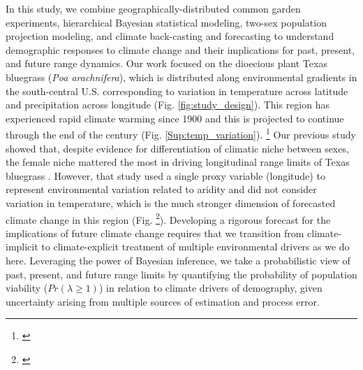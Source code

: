 \documentclass[12pt]{article}\usepackage[]{graphicx}\usepackage[dvipsnames]{xcolor}
\newcommand{\tom}[2]{{\color{red}{#1}}\footnote{\textit{\color{red}{#2}}}}
\begin{document}

In this study, we combine geographically-distributed common garden experiments, hierarchical Bayesian statistical modeling, two-sex population projection modeling, and climate back-casting and forecasting to understand demographic responses to climate change and their implications for past, present, and future range dynamics. 
Our work focused on the dioecious plant Texas bluegrass (\textit{Poa arachnifera}), which is distributed along environmental gradients in the south-central U.S. corresponding to variation in temperature across latitude and precipitation across longitude (Fig. \ref{fig:study_design}). 
This region has experienced rapid climate warming since 1900 and this is projected to continue through the end of the century (Fig. \ref{Sup:temp_variation}).  
\tom{For example,}{Provide a more quantitative summary of how the climate is changing, i.e. For example, summer temperatures have increased by XX-XX degrees C since 1900, and climate models predict another XX-XX degrees of warming by 2100.}
Our previous study showed that, despite evidence for differentiation of climatic niche between sexes, the female niche mattered the most in driving longitudinal range limits of Texas bluegrass \citep{miller2022two}. 
However, that study used a single proxy variable (longitude) to represent environmental variation related to aridity and did not consider variation in temperature, which is the much stronger dimension of forecasted climate change in this region (Fig. \tom{\ref{Sup:temp_variation},\ref{Sup:pr_variation}}{Please improve the legend for these figures.}). 
Developing a rigorous forecast for the implications of future climate change requires that we transition from climate-implicit to climate-explicit treatment of multiple environmental drivers as we do here.
Leveraging the power of Bayesian inference, we take a probabilistic view of past, present, and future range limits by quantifying the probability of population viability ($Pr(\lambda\ge1)$) in relation to climate drivers of demography, given uncertainty arising from multiple sources of estimation and process error. %
\end{document}
